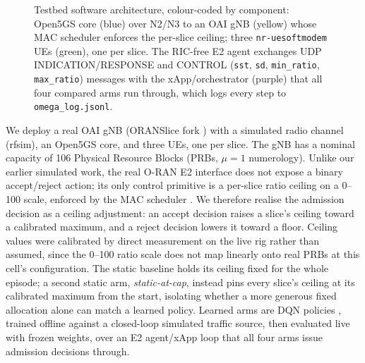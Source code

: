 \documentclass[conference]{IEEEtran}
\newcommand{\iconGear}[1]{\tikz[baseline=-0.55ex, scale=0.075, color=#1]{
  \foreach \a in {0,30,...,330} {\draw[thick] (\a:0.95) -- (\a:1.35);}
  \draw[thick] (0,0) circle (0.95);
  \draw[thick] (0,0) circle (0.4);
}}
\begin{document}
\begin{figure}[t]
\caption{Testbed software architecture, colour-coded by component: Open5GS core (blue) over N2/N3 to an OAI gNB (yellow) whose MAC scheduler enforces the per-slice ceiling; three \texttt{nr-uesoftmodem} UEs (green), one per slice. The RIC-free E2 agent exchanges UDP INDICATION/RESPONSE and CONTROL (\texttt{sst}, \texttt{sd}, \texttt{min\_ratio}, \texttt{max\_ratio}) messages with the xApp/orchestrator (purple) that all four compared arms run through, which logs every step to \texttt{omega\_log.jsonl}.}
\label{fig:architecture}
\end{figure}

We deploy a real OAI gNB (ORANSlice fork \cite{oranslice}) with a
simulated radio channel (rfsim), an Open5GS core, and three UEs, one
per slice. The gNB has a nominal capacity of 106 Physical Resource
Blocks (PRBs, $\mu=1$ numerology). Unlike our earlier simulated work,
the real O-RAN E2 interface does not expose a binary accept/reject
action; its only control primitive is a per-slice ratio ceiling on a
0--100 scale, enforced by the MAC scheduler \cite{oran-e2ap}. We
therefore realise the admission decision as a ceiling adjustment: an
accept decision raises a slice's ceiling toward a calibrated maximum,
and a reject decision lowers it toward a floor. Ceiling values were
calibrated by direct measurement on the live rig rather than assumed,
since the 0--100 ratio scale does not map linearly onto real PRBs at
this cell's configuration. The static baseline holds its ceiling
fixed for the whole episode; a second static arm, \emph{static-at-cap},
instead pins every slice's ceiling at its calibrated maximum from the
start, isolating whether a more generous fixed allocation alone can
match a learned policy. Learned arms are DQN policies \cite{dqn},
trained offline against a closed-loop simulated traffic source, then
evaluated live with frozen weights, over an E2 agent/xApp loop that
all four arms issue admission decisions through.
\end{document}
